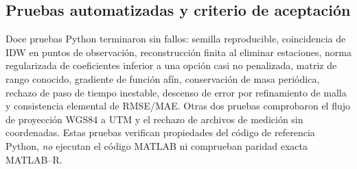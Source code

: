 \subsection{Pruebas automatizadas y criterio de aceptación}
Doce pruebas Python terminaron sin fallos: semilla reproducible, coincidencia de IDW en puntos de observación, reconstrucción finita al eliminar estaciones, norma regularizada de coeficientes inferior a una opción casi no penalizada, matriz de rango conocido, gradiente de función afín, conservación de masa periódica, rechazo de paso de tiempo inestable, descenso de error por refinamiento de malla y consistencia elemental de RMSE/MAE. Otras dos pruebas comprobaron el flujo de proyección WGS84 a UTM y el rechazo de archivos de medición sin coordenadas. Estas pruebas verifican propiedades del código de referencia Python, \emph{no} ejecutan el código MATLAB ni comprueban paridad exacta MATLAB--R.
